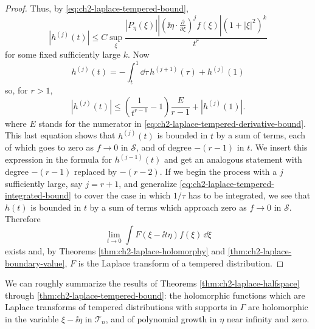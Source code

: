 \begin{proof}
Thus, by \eqref{eq:ch2-laplace-tempered-bound},
\begin{equation}
  |h^{(j)}(t)|\leq C\sup_\xi
  \frac{|P_\eta(\xi)|
  \left|\left(\ii\eta\mathbin{\cdot}\frac{\partial}{\partial\xi}\right)^j
  f(\xi)\right|(1+|\xi|^2)^k}{t^r}
  \tag{2-82}\label{eq:ch2-laplace-tempered-derivative-bound}
\end{equation}
for some fixed sufficiently large $k$.  Now
\begin{equation*}
  h^{(j)}(t)=-\int_t^1\dd\tau\,h^{(j+1)}(\tau)+h^{(j)}(1)
\end{equation*}
so, for $r>1$,
\begin{equation}
  |h^{(j)}(t)|\leq
  \left(\frac{1}{t^{r-1}}-1\right)\frac{E}{r-1}+|h^{(j)}(1)| .
  \tag{2-83}\label{eq:ch2-laplace-tempered-integrated-bound}
\end{equation}
where $E$ stands for the numerator in \eqref{eq:ch2-laplace-tempered-derivative-bound}.  This last equation shows
that $h^{(j)}(t)$ is bounded in $t$ by a sum of terms, each of which goes to
zero as $f\to0$ in $\mathcal{S}$, and of degree $-(r-1)$ in $t$.  We insert
this expression in the formula for $h^{(j-1)}(t)$ and get an analogous
statement with degree $-(r-1)$ replaced by $-(r-2)$.  If we begin the
process with a $j$ sufficiently large, say $j=r+1$, and generalize \eqref{eq:ch2-laplace-tempered-integrated-bound}
to cover the case in which $1/\tau$ has to be integrated, we see that
$h(t)$ is bounded in $t$ by a sum of terms which approach zero as
$f\to0$ in $\mathcal{S}$.  Therefore
\begin{equation*}
  \lim_{t\to0}\int F(\xi-\ii t\eta)f(\xi)\,\dd\xi
\end{equation*}
exists and, by Theorems \ref{thm:ch2-laplace-holomorphy} and \ref{thm:ch2-laplace-boundary-value}, $F$ is the Laplace transform of a
tempered distribution.
\end{proof}

We can roughly summarize the results of Theorems \ref{thm:ch2-laplace-halfspace} through \ref{thm:ch2-laplace-tempered-bound}: the
holomorphic functions which are Laplace transforms of tempered
distributions with supports in $\Gamma$ are holomorphic in the variable
$\xi-\ii\eta$ in $\mathcal{T}_n$, and of polynomial growth in $\eta$ near
infinity and zero.
